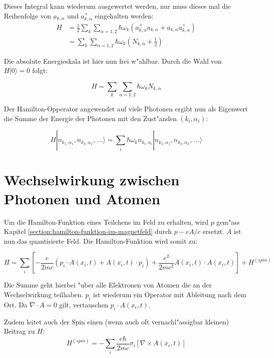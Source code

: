 Dieses Integral kann wiederum ausgewertet werden, nur muss dieses mal die Reihenfolge von $a_{k,\alpha}$ und $a^+_{k,\alpha}$ eingehalten werden:
\begin{equation}
\begin{split}
H &= \frac{1}{2} \sum_k \sum_{\alpha=1,2} \hbar \omega_k (a^+_{k,\alpha} a_{k,\alpha} + a_{k,\alpha} a^+_{k,\alpha}) \\
&= \sum_k \sum_{\alpha=1,2} \hbar \omega_k (N_{k,\alpha} + \frac{1}{2} )
\end{split}
\end{equation}

Die absolute Energieskala ist hier nun frei w"ahlbar. Durch die Wahl von $H|0\rangle = 0$ folgt:

\begin{equation}
H = \sum_k \sum_{\alpha=1,2} \hbar \omega_k N_{k,\alpha}
\end{equation}

Der Hamilton-Opperator angewendet auf viele Photonen ergibt nun als Eigenwert die Summe der Energie der Photonen mit den Zust"anden $(k_i,\alpha_i)$:

\begin{equation}
H |n_{k_1,\alpha_1}, n_{k_2,\alpha_2}, \, \hdots\rangle = \sum_i \hbar \omega_k n_{k_i,\alpha_i} |n_{k_1,\alpha_1}, n_{k_2,\alpha_2}, \, \hdots\rangle
\end{equation}

\section{Wechselwirkung zwischen Photonen und Atomen}

Um die Hamilton-Funktion eines Teilchens im Feld zu erhalten, wird $p$ gem"ass Kapitel \ref{section:hamilton-funktion-im-magnetfeld} durch $p -eA/c$ ersetzt. $A$ ist nun das quantisierte Feld. Die Hamilton-Funktion wird somit zu:

\begin{equation}
H = \sum_i \left[ -\frac{e}{2mc}(p_i \cdot A(x_i, t) + A(x_i, t) \cdot p_i) + \frac{e^2}{2mc^2}A(x_i, t) \cdot A(x_i, t)\right] + H^{(spin)}
\end{equation}

Die Summe geht hierbei "uber alle Elektronen von Atomen die an der Wechselwirkung teilhaben. $p_i$ ist wiederum ein Operator mit Ableitung nach dem Ort. Da $\nabla \cdot A = 0$ gilt, vertauschen $p_i \cdot A(x_i, t)$.

Zudem leitet auch der Spin einen (wenn auch oft vernachl"assigbar kleinen) Beitrag zu $H$:
\begin{equation}
H^{(spin)} = - \sum_i \frac{e \hbar}{2mc}\sigma_i \left[\nabla \times A(x_i, t)\right]
\end{equation}

